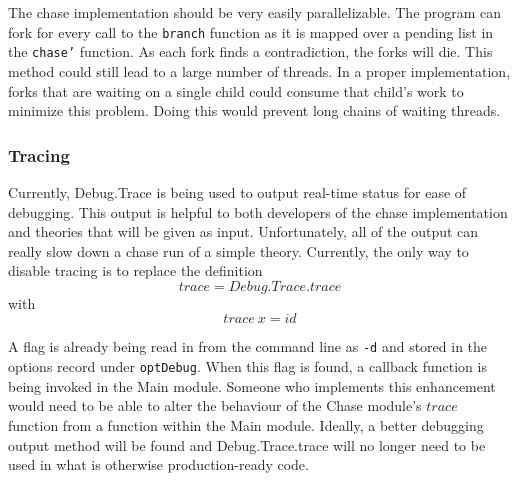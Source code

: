 			The chase implementation should be very easily parallelizable. The
			program can fork for every call to the {\tt branch} function as it
			is mapped over a pending list in the {\tt chase'} function. As each
			fork finds a contradiction, the forks will die. This method could
			still lead to a large number of threads. In a proper implementation,
			forks that are waiting on a single child could consume that child's
			work to minimize this problem. Doing this would prevent long chains
			of waiting threads.

		\subsubsection{Tracing}

			Currently, Debug.Trace is being used to output real-time status for
			ease of debugging. This output is helpful to both developers of
			the chase implementation and theories that will be given as input.
			Unfortunately, all of the output can really slow down a chase run
			of a simple theory. Currently, the only way to disable tracing is
			to replace the definition
				\[
				trace = Debug.Trace.trace
				\]
			with
				\[
				trace\ x = id
				\]

			A flag is already being read in from the command line as {\tt -d}
			and stored in the options record under {\tt optDebug}. When this
			flag is found, a callback function is being invoked in the Main
			module. Someone who implements this enhancement would need to be
			able to alter the behaviour of the Chase module's $trace$ function
			from a function within the Main module. Ideally, a better
			debugging output method will be found and Debug.Trace.trace will no
			longer need to be used in what is otherwise production-ready code.
